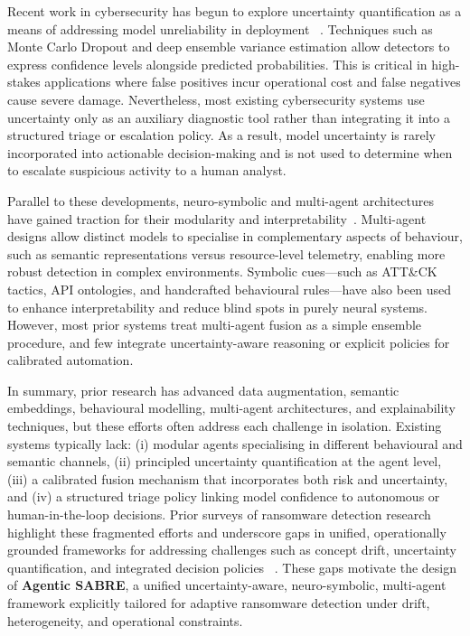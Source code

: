 \documentclass[lettersize,journal]{IEEEtran}
\begin{document}
Recent work in cybersecurity has begun to explore uncertainty quantification as a means of addressing model unreliability in deployment ~\cite{gal2016dropout, gawlikowski2023Uncertainity, kabuye2025explainable}. Techniques such as Monte Carlo Dropout and deep ensemble variance estimation allow detectors to express confidence levels alongside predicted probabilities. This is critical in high-stakes applications where false positives incur operational cost and false negatives cause severe damage. Nevertheless, most existing cybersecurity systems use uncertainty only as an auxiliary diagnostic tool rather than integrating it into a structured triage or escalation policy. As a result, model uncertainty is rarely incorporated into actionable decision-making and is not used to determine when to escalate suspicious activity to a human analyst.

Parallel to these developments, neuro-symbolic and multi-agent architectures have gained traction for their modularity and interpretability~\cite{Besold2021neurosymbolicsurvey}. Multi-agent designs allow distinct models to specialise in complementary aspects of behaviour, such as semantic representations versus resource-level telemetry, enabling more robust detection in complex environments. Symbolic cues—such as ATT\&CK tactics, API ontologies, and handcrafted behavioural rules—have also been used to enhance interpretability and reduce blind spots in purely neural systems. However, most prior systems treat multi-agent fusion as a simple ensemble procedure, and few integrate uncertainty-aware reasoning or explicit policies for calibrated automation.

In summary, prior research has advanced data augmentation, semantic embeddings, behavioural modelling, multi-agent architectures, and explainability techniques, but these efforts often address each challenge in isolation. Existing systems typically lack: (i) modular agents specialising in different behavioural and semantic channels, (ii) principled uncertainty quantification at the agent level, (iii) a calibrated fusion mechanism that incorporates both risk and uncertainty, and (iv) a structured triage policy linking model confidence to autonomous or human-in-the-loop decisions. Prior surveys of ransomware detection research highlight these fragmented efforts and underscore gaps in unified, operationally grounded frameworks for addressing challenges such as concept drift, uncertainty quantification, and integrated decision policies ~\cite{Ispahany2024Survey}. These gaps motivate the design of \textbf{Agentic SABRE}, a unified uncertainty-aware, neuro-symbolic, multi-agent framework explicitly tailored for adaptive ransomware detection under drift, heterogeneity, and operational constraints.
\end{document}
